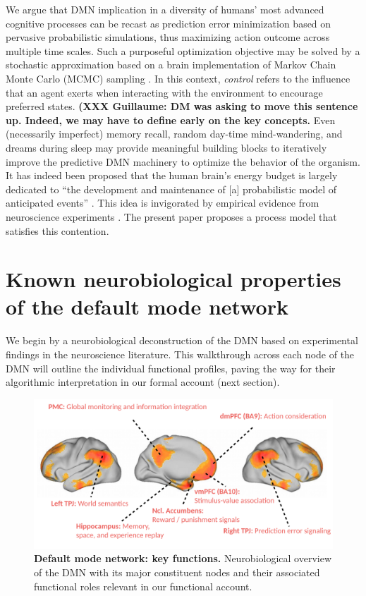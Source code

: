 \documentclass[10pt,letterpaper]{article}
\begin{document}
We argue that DMN implication in a
diversity of humans' most advanced cognitive processes
can be recast as prediction error minimization
based on pervasive probabilistic simulations,
thus maximizing action outcome across multiple time scales.
Such a purposeful optimization objective
may be solved by a stochastic approximation
based on a brain implementation of Markov Chain Monte Carlo (MCMC) sampling
\citep{tenenbaum2011grow}.
In this context,
\textit{control} refers to the influence that an agent exerts when interacting
with the environment to encourage preferred states. \textbf{(XXX Guillaume: DM was asking to move this sentence up. Indeed, we may have to define early on the key concepts.}
Even (necessarily imperfect) memory recall,
random day-time mind-wandering, and dreams during sleep
may provide meaningful building blocks to iteratively improve
the predictive DMN machinery to optimize the behavior of the organism.
%
It has indeed been proposed that
the human brain's energy budget is largely dedicated to
``the development and maintenance of [a]
probabilistic model of anticipated events''
\citep{raichle2005intrinsic}.
This idea is invigorated by
empirical evidence from
neuroscience experiments \citep{kording2004bayesian, fiser2004small}.
The present paper proposes a
process model that satisfies this contention.




\section{Known neurobiological properties of the default mode network}
We begin by a neurobiological deconstruction of the DMN
based on experimental findings in the neuroscience literature.
This walkthrough across each node of the DMN will
outline the individual functional profiles,
paving the way for their algorithmic interpretation
in our formal account (next section).

\begin{figure}[!h]
  \includegraphics[width=.9\linewidth]{neurobiological_overview_DMN.pdf}
  \caption{\textbf{Default mode network: key functions.}
  Neurobiological overview of the DMN with its major constituent nodes and
  their associated functional roles relevant in our functional account.}
  \label{fig:neurobiological_overview_DMN}
\end{figure}
%
\end{document}
